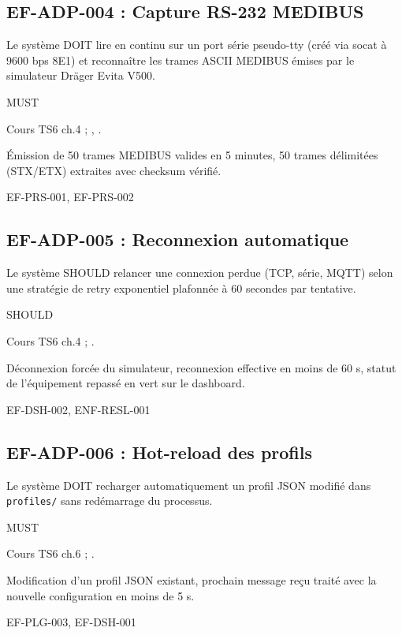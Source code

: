 \subsection*{EF-ADP-004 : Capture RS-232 MEDIBUS}
\begin{description}[leftmargin=2.5cm, style=nextline]
  \item[Énoncé] Le système DOIT lire en continu sur un port série pseudo-tty (créé via socat à 9600 bps 8E1) et reconnaître les trames ASCII MEDIBUS émises par le simulateur Dräger Evita V500.
  \item[Priorité] MUST
  \item[Source] Cours TS6 ch.4 ; \cite{draeger_medibus_protocol}, \cite{mdpnp_medibus_impl}.
  \item[Recette] Émission de 50 trames MEDIBUS valides en 5 minutes, 50 trames délimitées (STX/ETX) extraites avec checksum vérifié.
  \item[Lié à] EF-PRS-001, EF-PRS-002
\end{description}

\subsection*{EF-ADP-005 : Reconnexion automatique}
\begin{description}[leftmargin=2.5cm, style=nextline]
  \item[Énoncé] Le système SHOULD relancer une connexion perdue (TCP, série, MQTT) selon une stratégie de retry exponentiel plafonnée à 60 secondes par tentative.
  \item[Priorité] SHOULD
  \item[Source] Cours TS6 ch.4 ; \cite{ihe_pcd_tf}.
  \item[Recette] Déconnexion forcée du simulateur, reconnexion effective en moins de 60 s, statut de l'équipement repassé en vert sur le dashboard.
  \item[Lié à] EF-DSH-002, ENF-RESL-001
\end{description}

\subsection*{EF-ADP-006 : Hot-reload des profils}
\begin{description}[leftmargin=2.5cm, style=nextline]
  \item[Énoncé] Le système DOIT recharger automatiquement un profil JSON modifié dans \texttt{profiles/} sans redémarrage du processus.
  \item[Priorité] MUST
  \item[Source] Cours TS6 ch.6 ; \cite{ihe_pcd_tf}.
  \item[Recette] Modification d'un profil JSON existant, prochain message reçu traité avec la nouvelle configuration en moins de 5 s.
  \item[Lié à] EF-PLG-003, EF-DSH-001
\end{description}

